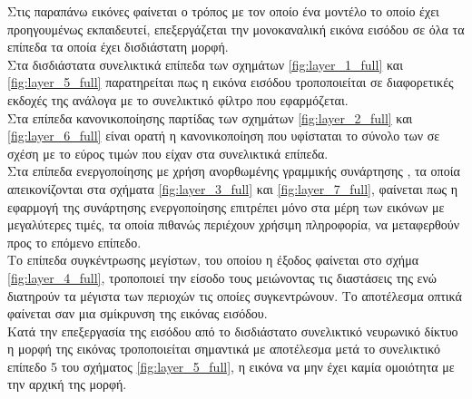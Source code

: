 Στις παραπάνω εικόνες φαίνεται ο τρόπος με τον οποίο ένα μοντέλο το οποίο έχει προηγουμένως εκπαιδευτεί, επεξεργάζεται την μονοκαναλική εικόνα εισόδου σε όλα τα επίπεδα τα οποία έχει δισδιάστατη μορφή.\\

Στα δισδιάστατα συνελικτικά επίπεδα των σχημάτων \ref{fig:layer_1_full} και \ref{fig:layer_5_full} παρατηρείται πως η εικόνα εισόδου τροποποιείται σε διαφορετικές εκδοχές της ανάλογα με το συνελικτικό φίλτρο που εφαρμόζεται.\\

Στα επίπεδα κανονικοποίησης παρτίδας των σχημάτων \ref{fig:layer_2_full} και \ref{fig:layer_6_full} είναι ορατή η κανονικοποίηση που υφίσταται το σύνολο των  σε σχέση με το εύρος τιμών που είχαν στα συνελικτικά επίπεδα.\\

Στα επίπεδα ενεργοποίησης με χρήση ανορθωμένης γραμμικής συνάρτησης , τα οποία απεικονίζονται στα σχήματα \ref{fig:layer_3_full} και \ref{fig:layer_7_full}, φαίνεται πως η εφαρμογή της συνάρτησης ενεργοποίησης επιτρέπει μόνο στα μέρη των εικόνων με μεγαλύτερες τιμές, τα οποία πιθανώς περιέχουν χρήσιμη πληροφορία, να μεταφερθούν προς το επόμενο επίπεδο.\\

Το επίπεδα συγκέντρωσης μεγίστων, του οποίου η έξοδος φαίνεται στο σχήμα \ref{fig:layer_4_full}, τροποποιεί την είσοδο τους μειώνοντας τις διαστάσεις της ενώ διατηρούν τα μέγιστα των περιοχών τις οποίες συγκεντρώνουν. Το αποτέλεσμα οπτικά φαίνεται σαν μια σμίκρυνση της εικόνας εισόδου.\\

Κατά την επεξεργασία της εισόδου από το δισδιάστατο συνελικτικό νευρωνικό δίκτυο η μορφή της εικόνας τροποποιείται σημαντικά με αποτέλεσμα μετά το συνελικτικό επίπεδο 5 του σχήματος \ref{fig:layer_5_full}, η εικόνα να μην έχει καμία ομοιότητα με την αρχική της μορφή.
